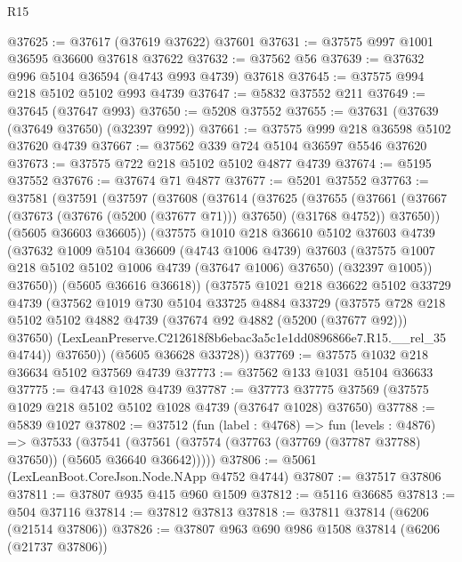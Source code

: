 \begin{lexlean}{R15}
\begin{coremodule}
{{{{{{{{{{{@37625 := @37617 (@37619 @37622) @37601
@37631 := @37575 @997 @1001 @36595 @36600 @37618 @37622
@37632 := @37562 @56
@37639 := @37632 @996 @5104 @36594 (@4743 @993 @4739) @37618
@37645 := @37575 @994 @218 @5102 @5102 @993 @4739
@37647 := @5832 @37552 @211
@37649 := @37645 (@37647 @993)
@37650 := @5208 @37552
@37655 := @37631 (@37639 (@37649 @37650) (@32397 @992))
@37661 := @37575 @999 @218 @36598 @5102 @37620 @4739
@37667 := @37562 @339 @724 @5104 @36597 @5546 @37620
@37673 := @37575 @722 @218 @5102 @5102 @4877 @4739
@37674 := @5195 @37552
@37676 := @37674 @71 @4877
@37677 := @5201 @37552
@37763 := @37581
    (@37591
      (@37597
        (@37608
          (@37614
            (@37625
              (@37655
                (@37661
                  (@37667 (@37673 (@37676 (@5200 (@37677 @71))) @37650) (@31768 @4752))
                  @37650))
              (@5605 @36603 @36605))
            (@37575
              @1010
              @218
              @36610
              @5102
              @37603
              @4739
              (@37632
                @1009
                @5104
                @36609
                (@4743 @1006 @4739)
                @37603
                (@37575 @1007 @218 @5102 @5102 @1006 @4739 (@37647 @1006) @37650)
                (@32397 @1005))
              @37650))
          (@5605 @36616 @36618))
        (@37575
          @1021
          @218
          @36622
          @5102
          @33729
          @4739
          (@37562
            @1019
            @730
            @5104
            @33725
            @4884
            @33729
            (@37575
              @728
              @218
              @5102
              @5102
              @4882
              @4739
              (@37674 @92 @4882 (@5200 (@37677 @92)))
              @37650)
            (LexLeanPreserve.C212618f8b6ebac3a5c1e1dd0896866e7.R15.__rel_35 @4744))
          @37650))
      (@5605 @36628 @33728))
@37769 := @37575 @1032 @218 @36634 @5102 @37569 @4739
@37773 := @37562 @133 @1031 @5104 @36633
@37775 := @4743 @1028 @4739
@37787 := @37773 @37775 @37569 (@37575 @1029 @218 @5102 @5102 @1028 @4739 (@37647 @1028) @37650)
@37788 := @5839 @1027
@37802 := @37512
    (fun (label : @4768) =>
    fun (levels : @4876) =>
    @37533
      (@37541 (@37561 (@37574 (@37763 (@37769 (@37787 @37788) @37650)) (@5605 @36640 @36642)))))
@37806 := @5061 (LexLeanBoot.CoreJson.Node.NApp @4752 @4744)
@37807 := @37517 @37806
@37811 := @37807 @935 @415 @960 @1509
@37812 := @5116 @36685
@37813 := @504 @37116
@37814 := @37812 @37813
@37818 := @37811 @37814 (@6206 (@21514 @37806))
@37826 := @37807 @963 @690 @986 @1508 @37814 (@6206 (@21737 @37806))
}}}}}}}}}}}
\end{coremodule}
\end{lexlean}
